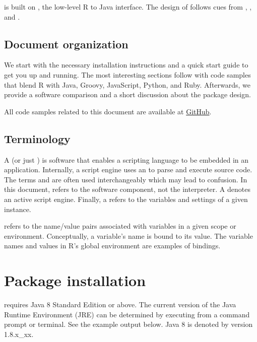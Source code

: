  is built on  \citep{rjava}, the low-level R to Java interface. The design of  follows cues from ,  \citep{rscala}, and  \citep{v8pkg}.

\subsection{Document organization}

We start with the necessary installation instructions and a quick start guide to get you up and running. The most interesting sections follow with code samples that blend R with Java, Groovy, JavaScript, Python, and Ruby. Afterwards, we provide a software comparison and a short discussion about the  package design.

All code samples related to this document are available at \href{http://notavalidaddresss////}{GitHub}.

\subsection{Terminology}

A  (or just ) is software that enables a scripting language to be embedded in an application. Internally, a script engine uses an  to parse and execute source code. The terms  and  are often used interchangeably which may lead to confusion. In this document,  refers to the software component, not the interpreter. A  denotes an active script engine. Finally, a  refers to the variables and settings of a given instance.

 refers to the name/value pairs associated with variables in a given scope or environment. Conceptually, a variable's name is bound to its value. The variable names and values in R's global environment are examples of bindings.

\section{Package installation}

 requires Java 8 Standard Edition or above. The current version of the Java Runtime Environment (JRE) can be determined by executing  from a command prompt or terminal. See the example output below.  Java 8 is denoted by version 1.8.x\_xx.

